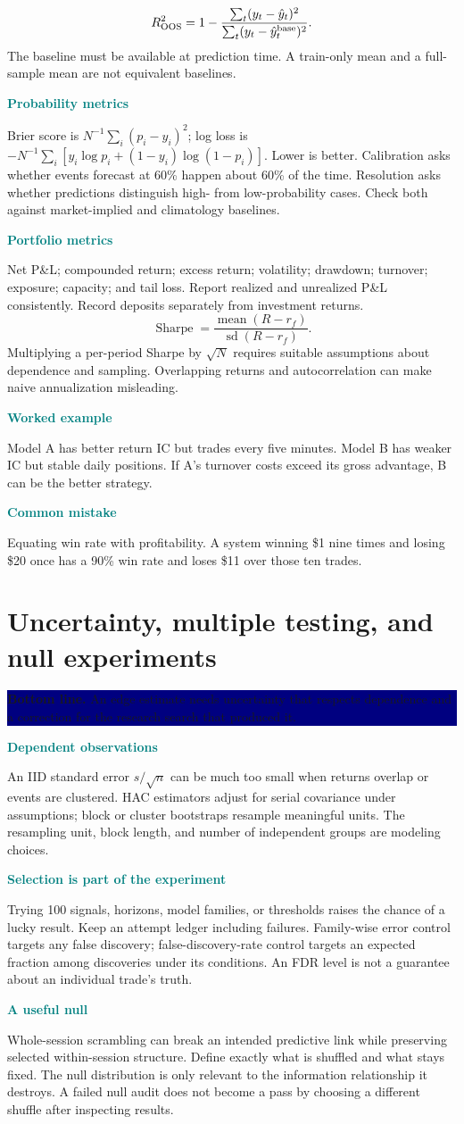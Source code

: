 \documentclass[10pt,letterpaper]{article}
\newcommand{\bl}[1]{\noindent\colorbox{navy}{\parbox{\dimexpr\linewidth-2\fboxsep}{\color{white}\textbf{Bottom line.} #1}}\par\medskip}
\newcommand{\topic}[2]{\clearpage\section{#1}\bl{#2}}
\newcommand{\sub}[1]{\par\textbf{\textcolor{teal}{#1}}\par}
\newcommand{\ex}[1]{\sub{Worked example}#1}
\newcommand{\pit}[1]{\sub{Common mistake}#1}
\begin{document}
\[R^2_{\rm OOS}=1-\frac{\sum_t(y_t-\hat y_t)^2}{\sum_t(y_t-\hat y^{\rm base}_t)^2}.\]
The baseline must be available at prediction time. A train-only mean and a full-sample mean are not equivalent baselines.
\sub{Probability metrics}
Brier score is $N^{-1}\sum_i(p_i-y_i)^2$; log loss is
$-N^{-1}\sum_i[y_i\log p_i+(1-y_i)\log(1-p_i)]$.
Lower is better. Calibration asks whether events forecast at 60\% happen about 60\% of the time. Resolution asks whether predictions distinguish high- from low-probability cases. Check both against market-implied and climatology baselines.
\sub{Portfolio metrics}
Net P\&L; compounded return; excess return; volatility; drawdown; turnover; exposure; capacity; and tail loss. Report realized and unrealized P\&L consistently. Record deposits separately from investment returns.
\[\operatorname{Sharpe}=\frac{\operatorname{mean}(R-r_f)}{\operatorname{sd}(R-r_f)}.\]
Multiplying a per-period Sharpe by $\sqrt{N}$ requires suitable assumptions about dependence and sampling. Overlapping returns and autocorrelation can make naive annualization misleading.
\ex{Model A has better return IC but trades every five minutes. Model B has weaker IC but stable daily positions. If A's turnover costs exceed its gross advantage, B can be the better strategy.}
\pit{Equating win rate with profitability. A system winning \$1 nine times and losing \$20 once has a 90\% win rate and loses \$11 over those ten trades.}
\topic{Uncertainty, multiple testing, and null experiments}{An edge estimate needs uncertainty that respects dependence and a correction for the research search that produced it.}
\sub{Dependent observations}
An IID standard error $s/\sqrt n$ can be much too small when returns overlap or events are clustered. HAC estimators adjust for serial covariance under assumptions; block or cluster bootstraps resample meaningful units. The resampling unit, block length, and number of independent groups are modeling choices.
\sub{Selection is part of the experiment}
Trying 100 signals, horizons, model families, or thresholds raises the chance of a lucky result. Keep an attempt ledger including failures. Family-wise error control targets any false discovery; false-discovery-rate control targets an expected fraction among discoveries under its conditions. An FDR level is not a guarantee about an individual trade's truth.
\sub{A useful null}
Whole-session scrambling can break an intended predictive link while preserving selected within-session structure. Define exactly what is shuffled and what stays fixed. The null distribution is only relevant to the information relationship it destroys. A failed null audit does not become a pass by choosing a different shuffle after inspecting results.
\end{document}

